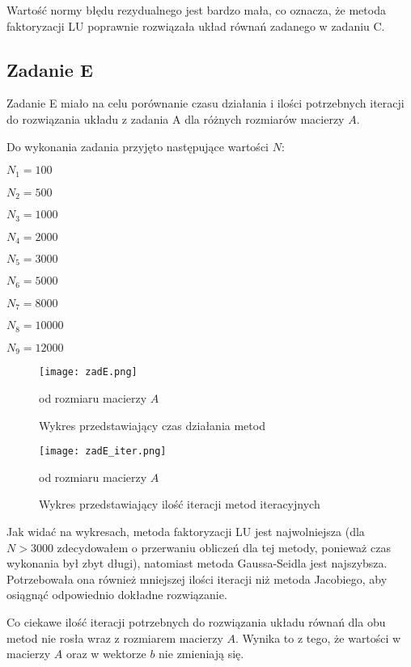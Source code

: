 \documentclass{article}
\begin{document}
Wartość normy błędu rezydualnego jest bardzo mała, co oznacza, że metoda
faktoryzacji LU poprawnie rozwiązała układ równań zadanego w zadaniu C.

\subsection{Zadanie E}
Zadanie E miało na celu porównanie czasu działania i ilości potrzebnych
iteracji do rozwiązania układu z zadania A dla różnych rozmiarów macierzy $A$.

Do wykonania zadania przyjęto następujące wartości $N$:

\begin{itemize}
    \begin{multicols}{3}
        \centering
        \item $N_1 = 100$
        \item $N_2 = 500$
        \item $N_3 = 1000$
        \item $N_4 = 2000$
        \item $N_5 = 3000$
        \item $N_6 = 5000$
        \item $N_7 = 8000$
        \item $N_8 = 10000$
        \item $N_9 = 12000$
    \end{multicols}
\end{itemize}

\begin{figure}[H]
    \texttt{[image: zadE.png]}
    \centering
    \caption{Wykres przedstawiający czas działania metod}
    {od rozmiaru macierzy $A$}
\end{figure}

\begin{figure}[H]
    \texttt{[image: zadE\_iter.png]}
    \centering
    \caption{Wykres przedstawiający ilość iteracji metod iteracyjnych}
    {od rozmiaru macierzy $A$}
\end{figure}

Jak widać na wykresach, metoda faktoryzacji LU jest najwolniejsza (dla $N > 3000$
zdecydowałem o przerwaniu obliczeń dla tej metody, ponieważ czas wykonania był 
zbyt długi), natomiast metoda Gaussa-Seidla jest najszybsza. Potrzebowała ona również
mniejszej ilości iteracji niż metoda Jacobiego, aby osiągnąć odpowiednio dokładne rozwiązanie.

Co ciekawe ilość iteracji potrzebnych do rozwiązania układu równań dla obu metod 
nie rosła wraz z rozmiarem macierzy $A$. Wynika to z tego, że wartości w macierzy $A$
oraz w wektorze $b$ nie zmieniają się.
\end{document}
